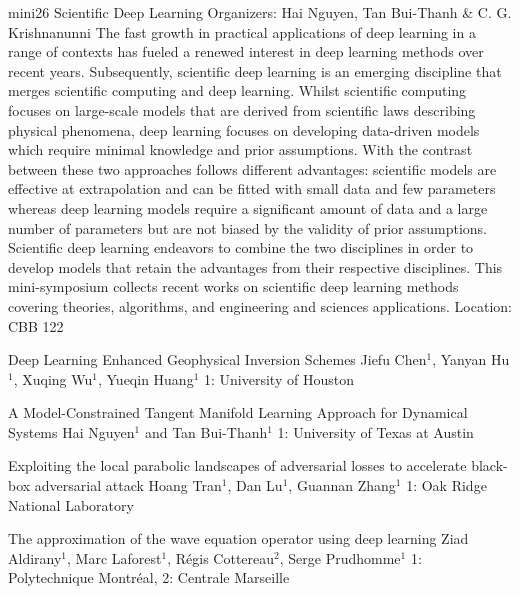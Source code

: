 \mini
{mini26}
{Scientific Deep Learning}
{Organizers: Hai Nguyen, Tan Bui-Thanh \& C. G. Krishnanunni}
{The fast growth in practical applications of deep learning in a range of contexts has fueled a renewed interest in deep learning methods over recent years. Subsequently, scientific deep learning is an emerging discipline that merges scientific computing and deep learning. Whilst scientific computing focuses on large-scale models that are derived from scientific laws describing physical phenomena, deep learning focuses on developing data-driven models which require minimal knowledge and prior assumptions. With the contrast between these two approaches follows different advantages: scientific models are effective at extrapolation and can be fitted with small data and few parameters whereas deep learning models require a significant amount of data and a large number of parameters but are not biased by the validity of prior assumptions. Scientific deep learning endeavors to combine the two disciplines in order to develop models that retain the advantages from their respective disciplines. This mini-symposium collects recent works on scientific deep learning methods covering theories, algorithms, and engineering and sciences applications.}
{Location: CBB 122}

\begin{talks}
\item\talk
{Deep Learning Enhanced Geophysical Inversion Schemes}
{Jiefu Chen$^{1}$, Yanyan Hu$^{1}$, Xuqing Wu$^{1}$, Yueqin Huang$^{1}$}
{1: University of Houston}
\item\talk
{A Model-Constrained Tangent Manifold Learning Approach for Dynamical Systems}
{Hai Nguyen$^1$ and Tan Bui-Thanh$^1$}
{1: University of Texas at Austin}
\item\talk
{Exploiting the local parabolic landscapes of adversarial losses to accelerate black-box adversarial attack}
{Hoang Tran$^{1}$, Dan Lu$^{1}$, Guannan Zhang$^{1}$}
{1: Oak Ridge National Laboratory}
\item\talk
{The approximation of the wave equation operator using deep learning }
{Ziad Aldirany$^{1}$, Marc Laforest$^{1}$, Régis Cottereau$^2$, Serge
Prudhomme$^{1}$ }
{1: Polytechnique Montréal, 2: Centrale Marseille}
\end{talks}
\room
